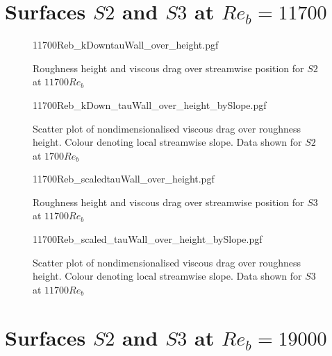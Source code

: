 \section{Surfaces $S2$ and $S3$ at $Re_b = 11700$}
\begin{figure}[h!]
    \centering
    {11700Reb_kDowntauWall_over_height.pgf}
    \caption{Roughness height and viscous drag over streamwise position for  $S2$ at $11700 Re_b$}
\end{figure}
\begin{figure}[h!]
    \centering
    \hspace{0.9cm}
    {11700Reb_kDown_tauWall_over_height_bySlope.pgf}
    \caption[Scatterplot of viscous drag over physical roughness height at $Re_b = 11700$ for $S2$]{Scatter plot of nondimensionalised viscous drag over roughness height. Colour denoting local streamwise slope. Data shown for $S2$ at $1700 Re_b$}
\end{figure}
\begin{figure}[h!]
    \centering
    {11700Reb_scaledtauWall_over_height.pgf}
    \caption{Roughness height and viscous drag over streamwise position for  $S3$ at $11700 Re_b$}
\end{figure}
\begin{figure}[h!]
    \centering
    \hspace{0.9cm}
    {11700Reb_scaled_tauWall_over_height_bySlope.pgf}
    \caption[Scatterplot of viscous drag over physical roughness height at $Re_b = 11700$ for $S3$]{Scatter plot of nondimensionalised viscous drag over roughness height. Colour denoting local streamwise slope. Data shown for $S3$ at $11700 Re_b$}
\end{figure}

\clearpage
\section{Surfaces $S2$ and $S3$ at $Re_b = 19000$}

